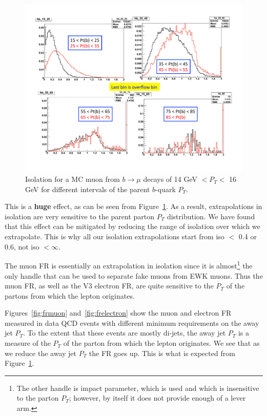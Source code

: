 \begin{figure}[htb]
\begin{center}
\includegraphics[width=0.75\linewidth]{figs/slavaIso.pdf}
\caption{Isolation for a MC muon from $b \to \mu$ decays
of 14 GeV $< P_T <$ 16 GeV for different intervals of the
parent $b$-quark $P_T$.
\label{fig:slavaIso}}
\end{center}
\end{figure}

This is a \textbf{huge} effect, as can be seen from 
Figure~\ref{fig:slavaIso}.  As a result, extrapolations
in isolation are very sensitive to the parent parton $P_T$
distribution.  We have found that this effect can be mitigated
by reducing the range of isolation over which we extrapolate.
This is why all our isolation extrapolations start from 
iso $<$ 0.4 or 0.6, not iso $< \infty$.

The muon FR is essentially an extrapolation in isolation
since it is almost\footnote{The other handle is 
impact parameter, which is used and 
which is insensitive to the parton $P_T$; however, by itself
it does not provide enough of a lever arm.}
the only handle that can be used
to separate fake muons from EWK muons.
Thus the muon FR, as well as the V3 electron FR, are quite
sensitive to the $P_T$ of the partons from which the 
lepton originates.


Figures~\ref{fig:frmuon} and~\ref{fig:frelectron} show
the muon and electron FR measured in data QCD events with 
different minimum requirements on the away jet $P_T$.  
To the extent that these events are mostly di-jets, 
the away jet $P_T$ is a measure of the $P_T$ of the 
parton from which the lepton originates.  We see that
as we reduce the away jet $P_T$ the FR goes up.
This is what is expected from Figure~\ref{fig:slavaIso}.

